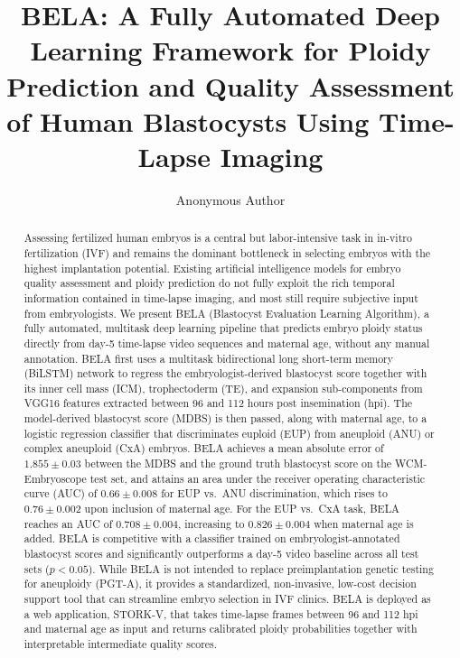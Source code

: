 \documentclass[11pt,a4paper]{article}
\title{BELA: A Fully Automated Deep Learning Framework for Ploidy Prediction and
Quality Assessment of Human Blastocysts Using Time-Lapse Imaging}
\author[1]{Anonymous Author}
\affil[1]{Department of Computational Biology}
\date{}
\begin{document}
\maketitle

\begin{abstract}
Assessing fertilized human embryos is a central but labor-intensive task in
in-vitro fertilization (IVF) and remains the dominant bottleneck in
selecting embryos with the highest implantation potential. Existing
artificial intelligence models for embryo quality assessment and ploidy
prediction do not fully exploit the rich temporal information contained in
time-lapse imaging, and most still require subjective input from
embryologists. We present BELA (Blastocyst Evaluation Learning Algorithm),
a fully automated, multitask deep learning pipeline that predicts embryo
ploidy status directly from day-5 time-lapse video sequences and maternal
age, without any manual annotation. BELA first uses a multitask
bidirectional long short-term memory (BiLSTM) network to regress the
embryologist-derived blastocyst score together with its inner cell mass
(ICM), trophectoderm (TE), and expansion sub-components from VGG16
features extracted between 96 and 112 hours post insemination (hpi). The
model-derived blastocyst score (MDBS) is then passed, along with maternal
age, to a logistic regression classifier that discriminates euploid (EUP)
from aneuploid (ANU) or complex aneuploid (CxA) embryos. BELA achieves a
mean absolute error of $1.855 \pm 0.03$ between the MDBS and the ground
truth blastocyst score on the WCM-Embryoscope test set, and attains an
area under the receiver operating characteristic curve (AUC) of $0.66 \pm
0.008$ for EUP vs.\ ANU discrimination, which rises to $0.76 \pm 0.002$
upon inclusion of maternal age. For the EUP vs.\ CxA task, BELA reaches an
AUC of $0.708 \pm 0.004$, increasing to $0.826 \pm 0.004$ when maternal
age is added. BELA is competitive with a classifier trained on
embryologist-annotated blastocyst scores and significantly outperforms a
day-5 video baseline across all test sets ($p < 0.05$). While BELA is not
intended to replace preimplantation genetic testing for aneuploidy
(PGT-A), it provides a standardized, non-invasive, low-cost decision
support tool that can streamline embryo selection in IVF clinics. BELA is
deployed as a web application, STORK-V, that takes time-lapse frames
between 96 and 112 hpi and maternal age as input and returns calibrated
ploidy probabilities together with interpretable intermediate quality
scores.
\end{abstract}
\end{document}
